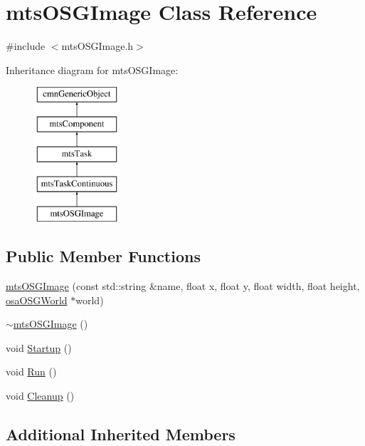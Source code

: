 \hypertarget{classmts_o_s_g_image}{\section{mts\-O\-S\-G\-Image Class Reference}
\label{classmts_o_s_g_image}
}


{\ttfamily \#include $<$mts\-O\-S\-G\-Image.\-h$>$}

Inheritance diagram for mts\-O\-S\-G\-Image\-:\begin{figure}[H]
\begin{center}
\leavevmode
\includegraphics[height=5.000000cm]{dc/d74/classmts_o_s_g_image}
\end{center}
\end{figure}
\subsection*{Public Member Functions}
\begin{DoxyCompactItemize}
\item 
\hyperlink{classmts_o_s_g_image_a89c464ab3f3139d21466cd035aa2a167}{mts\-O\-S\-G\-Image} (const std\-::string \&name, float x, float y, float width, float height, \hyperlink{classosa_o_s_g_world}{osa\-O\-S\-G\-World} $\ast$world)
\item 
\hyperlink{classmts_o_s_g_image_afa1ddbaae737c8d49a24f9ae0d7b977f}{$\sim$mts\-O\-S\-G\-Image} ()
\item 
void \hyperlink{classmts_o_s_g_image_a01e9d9b24324cb484ebdcd9740f0274f}{Startup} ()
\item 
void \hyperlink{classmts_o_s_g_image_a9512bb3ca14c4f6de9e64f2c0f7bda7c}{Run} ()
\item 
void \hyperlink{classmts_o_s_g_image_ab9f692410e0d5a58ba150d237f8f1b18}{Cleanup} ()
\end{DoxyCompactItemize}
\subsection*{Additional Inherited Members}


